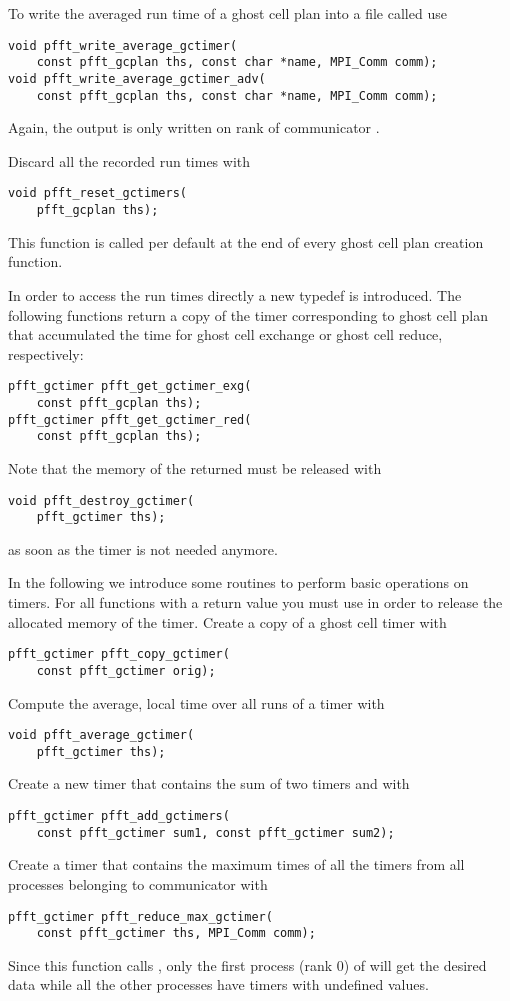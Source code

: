 To write the averaged run time of a ghost cell plan  into a file called  use
\begin{lstlisting}
void pfft_write_average_gctimer(
    const pfft_gcplan ths, const char *name, MPI_Comm comm);
void pfft_write_average_gctimer_adv(
    const pfft_gcplan ths, const char *name, MPI_Comm comm);
\end{lstlisting}
Again, the output is only written on rank  of communicator .

Discard all the recorded run times with
\begin{lstlisting}
void pfft_reset_gctimers(
    pfft_gcplan ths);
\end{lstlisting}
This function is called per default at the end of every ghost cell plan creation function.

In order to access the run times directly a new typedef  is introduced.
The following functions return a copy of the timer corresponding to ghost cell plan  that accumulated
the time for ghost cell exchange or ghost cell reduce, respectively:
\begin{lstlisting}
pfft_gctimer pfft_get_gctimer_exg(
    const pfft_gcplan ths);
pfft_gctimer pfft_get_gctimer_red(
    const pfft_gcplan ths);
\end{lstlisting}
Note that the memory of the returned  must be released with
\begin{lstlisting}
void pfft_destroy_gctimer(
    pfft_gctimer ths);
\end{lstlisting}
as soon as the timer is not needed anymore. 

In the following we introduce some routines to perform basic operations on timers.
For all functions with a  return value you must use 
in order to release the allocated memory of the timer.
Create a copy of a ghost cell timer  with
\begin{lstlisting}
pfft_gctimer pfft_copy_gctimer(
    const pfft_gctimer orig);
\end{lstlisting}
Compute the average, local time over all runs of a timer  with
\begin{lstlisting}
void pfft_average_gctimer(
    pfft_gctimer ths);
\end{lstlisting}
Create a new timer that contains the sum of two timers  and  with
\begin{lstlisting}
pfft_gctimer pfft_add_gctimers(
    const pfft_gctimer sum1, const pfft_gctimer sum2);
\end{lstlisting}
Create a timer that contains the maximum times of all the timers  from all processes belonging to communicator  with
\begin{lstlisting}
pfft_gctimer pfft_reduce_max_gctimer(
    const pfft_gctimer ths, MPI_Comm comm);
\end{lstlisting}
Since this function calls , only the first process (rank 0) of  will get the desired data while all
the other processes have timers with undefined values.

